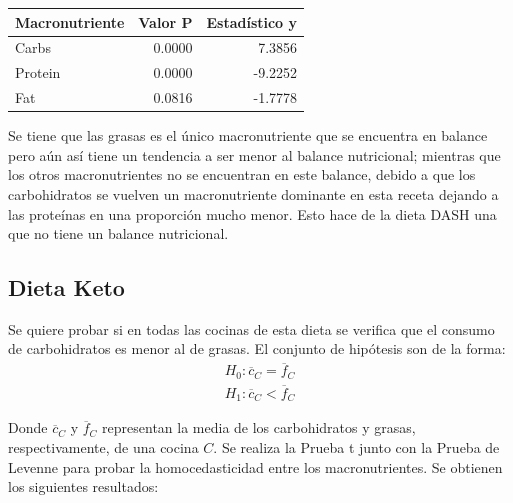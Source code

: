 \documentclass[12pt,a4paper]{article}
\begin{document}
{{            \begin{center}
                \begin{tabular}{lrr}
                \toprule
                    Macronutriente & Valor P & Estadístico y \\
                \midrule
                    Carbs   & 0.0000 &  7.3856 \\
                    Protein & 0.0000 & -9.2252 \\
                    Fat     & 0.0816 & -1.7778 \\
                \bottomrule
                \end{tabular}
            \end{center}

            Se tiene que las grasas es el único macronutriente que se encuentra en 
            balance pero aún así tiene un tendencia a ser menor al balance nutricional; 
            mientras que los otros macronutrientes no se encuentran en este balance, 
            debido a que los carbohidratos se vuelven un macronutriente dominante en 
            esta receta dejando a las proteínas en una proporción mucho menor. Esto hace 
            de la dieta DASH una que no tiene un balance nutricional.
        }

        \subsection{Dieta Keto}
        {
            Se quiere probar si en todas las cocinas de esta dieta 
            se verifica que el consumo de carbohidratos es menor al de grasas. 
            El conjunto de hipótesis son de la forma:
            \begin{align*}
                H_0 : \overline{c}_C = \overline{f}_C \\
                H_1 : \overline{c}_C < \overline{f}_C
            \end{align*}

            Donde $\overline{c}_C$ y $\overline{f}_C$ representan 
            la media de los carbohidratos y grasas, respectivamente, de 
            una cocina $C$. Se realiza la Prueba t junto con la Prueba de Levenne para 
            probar la homocedasticidad entre los macronutrientes. Se 
            obtienen los siguientes resultados:

}}
\end{document}
